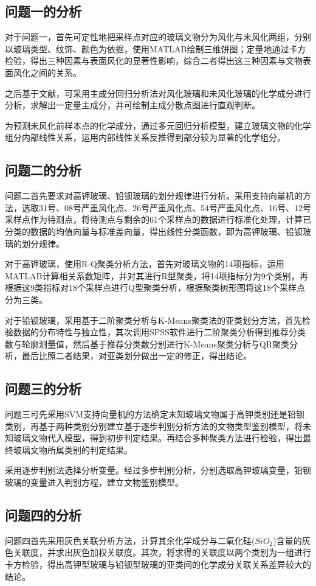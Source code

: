 \documentclass{my_paper}
\begin{document}
\subsection{问题一的分析}
对于问题一，首先可定性地把采样点对应的玻璃文物分为风化与未风化两组，分别以玻璃类型、纹饰、颜色为依据，使用MATLAB绘制三维饼图；定量地通过卡方检验，得出三种因素与表面风化的显著性影响，综合二者得出这三种因素与文物表面风化之间的关系。

之后基于文献\cite{崔剑锋2009湖南沅水流域战国时期楚墓出土古代玻璃器的成分分析}，可采用主成分回归分析法对风化玻璃和未风化玻璃的化学成分进行分析，求解出一定量主成分，并可绘制主成分散点图进行直观判断。

为预测未风化前样本点的化学成分，通过多元回归分析模型，建立玻璃文物的化学组分内部线性关系，运用内部线性关系反推得到部分较为显著的化学组分。

\subsection{问题二的分析}
问题二首先要求对高钾玻璃、铅钡玻璃的划分规律进行分析。采用支持向量机的方法，选取31号、08号严重风化点、26号严重风化点、54号严重风化点、16号、12号采样点作为待测点，将待测点与剩余的61个采样点的数据进行标准化处理，计算已分类的数据的均值向量与标准差向量，得出线性分类函数，即为高钾玻璃、铅钡玻璃的划分规律。

对于高钾玻璃，使用R-Q聚类分析方法，首先对玻璃文物的14项指标，运用MATLAB计算相关系数矩阵，并对其进行R型聚类，将14项指标分为9个类别，再根据这9类指标对18个采样点进行Q型聚类分析，根据聚类树形图将这18个采样点分为三类。

对于铅钡玻璃，采用基于二阶聚类分析与K-Means聚类法的亚类划分方法，首先检验数据的分布特性与独立性，其次调用SPSS软件进行二阶聚类分析得到推荐分类数与轮廓测量值，然后基于推荐分类数分别进行K-Means聚类分析与QR聚类分析，最后比照二者结果，对亚类划分做出一定的修正，得出结论。

\subsection{问题三的分析}
问题三可先采用SVM支持向量机的方法确定未知玻璃文物属于高钾类别还是铅钡类别，再基于两种类别分别建立基于逐步判别分析方法的文物类型鉴别模型，将未知玻璃文物代入模型，得到初步判定结果。再结合多种聚类方法进行检验，得出最终玻璃文物所属类别的判定结果。

采用逐步判别法选择分析变量。经过多步判别分析，分别选取高钾玻璃变量，铅钡玻璃的变量进入判别方程，建立文物鉴别模型。
\subsection{问题四的分析}
问题四首先采用灰色关联分析方法，计算其余化学成分与二氧化硅($SiO_2$)含量的灰色关联度，并求出灰色加权关联度。其次，将求得的关联度以两个类别为一组进行卡方检验，得出高钾型玻璃与铅钡型玻璃的亚类间的化学成分关联关系差异较大的结论。
\end{document}
